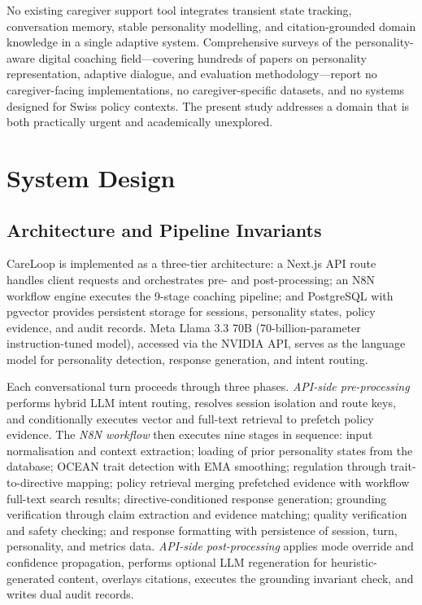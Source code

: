 \documentclass[10pt,a4paper]{report}
\begin{document}
No existing caregiver support tool integrates transient state tracking, conversation memory, stable personality modelling, and citation-grounded domain knowledge in a single adaptive system. Comprehensive surveys of the personality-aware digital coaching field---covering hundreds of papers on personality representation, adaptive dialogue, and evaluation methodology---report no caregiver-facing implementations, no caregiver-specific datasets, and no systems designed for Swiss policy contexts. The present study addresses a domain that is both practically urgent and academically unexplored.

\chapter{System Design}
\label{ch:system}

\section{Architecture and Pipeline Invariants}

CareLoop is implemented as a three-tier architecture: a Next.js API route handles client requests and orchestrates pre- and post-processing; an N8N workflow engine executes the 9-stage coaching pipeline; and PostgreSQL with pgvector provides persistent storage for sessions, personality states, policy evidence, and audit records. Meta Llama 3.3 70B (70-billion-parameter instruction-tuned model), accessed via the NVIDIA API, serves as the language model for personality detection, response generation, and intent routing.

Each conversational turn proceeds through three phases. \emph{API-side pre-processing} performs hybrid LLM intent routing, resolves session isolation and route keys, and conditionally executes vector and full-text retrieval to prefetch policy evidence. The \emph{N8N workflow} then executes nine stages in sequence: input normalisation and context extraction; loading of prior personality states from the database; OCEAN trait detection with EMA smoothing; regulation through trait-to-directive mapping; policy retrieval merging prefetched evidence with workflow full-text search results; directive-conditioned response generation; grounding verification through claim extraction and evidence matching; quality verification and safety checking; and response formatting with persistence of session, turn, personality, and metrics data. \emph{API-side post-processing} applies mode override and confidence propagation, performs optional LLM regeneration for heuristic-generated content, overlays citations, executes the grounding invariant check, and writes dual audit records.
\end{document}

